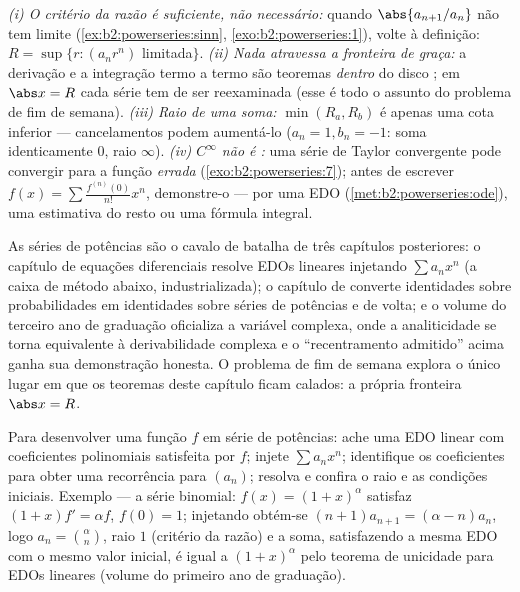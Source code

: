 \begin{remark}
\emph{(i) O critério da razão é suficiente, não necessário:} quando
$\abs{a_{n+1}/a_n}$ não tem limite
(\cref{ex:b2:powerseries:sinn}, \cref{exo:b2:powerseries:1}),
volte à definição: $R = \sup\{r : (a_nr^n)$
limitada$\}$. \emph{(ii) Nada atravessa a fronteira de graça:}
a derivação e a integração termo a termo são teoremas
\emph{dentro} do disco ; em $\abs x = R$ cada série tem de
ser reexaminada (esse é todo o assunto do problema de fim
de semana). \emph{(iii) Raio de uma soma:} $\min(R_a, R_b)$ é
apenas uma cota inferior --- cancelamentos podem aumentá-lo ($a_n = 1,
b_n = -1$: soma identicamente $0$, raio $\infty$). \emph{(iv)
$C^\infty$ não é :} uma série de Taylor convergente pode
convergir para a função \emph{errada}
(\cref{exo:b2:powerseries:7}); antes de escrever $f(x) = \sum
\frac{f^{(n)}(0)}{n!}x^n$, demonstre-o --- por uma EDO
(\cref{met:b2:powerseries:ode}), uma estimativa do resto ou uma
fórmula integral.
\end{remark}

\begin{remark}
As séries de potências são o cavalo de batalha de três capítulos posteriores: o
capítulo de equações diferenciais resolve EDOs lineares injetando
$\sum a_nx^n$ (a caixa de método abaixo, industrializada); o
capítulo de  converte identidades sobre
probabilidades em identidades sobre séries de potências e de volta; e
o volume do terceiro ano de graduação oficializa a variável complexa, onde a
analiticidade se torna equivalente à derivabilidade complexa e
o ``recentramento admitido'' acima ganha sua demonstração honesta. O
problema de fim de semana explora o único lugar em que os teoremas deste capítulo
ficam calados: a própria fronteira $\abs x = R$.
\end{remark}

\begin{method}\label{met:b2:powerseries:ode}
Para desenvolver uma função $f$ em série de potências: ache uma EDO linear com
coeficientes polinomiais satisfeita por $f$; injete $\sum a_nx^n$;
identifique os coeficientes para obter uma recorrência para $(a_n)$; resolva e
confira o raio e as condições iniciais. Exemplo --- a série
binomial: $f(x) = (1+x)^\alpha$ satisfaz $(1+x)f' = \alpha f$, $f(0)
= 1$; injetando obtém-se $(n+1)a_{n+1} = (\alpha - n)a_n$, logo $a_n =
\binom{\alpha}{n}$, raio $1$ (critério da razão) e a soma, satisfazendo
a mesma EDO com o mesmo valor inicial, é igual a $(1 + x)^\alpha$
pelo teorema de unicidade para EDOs lineares (volume do primeiro ano de graduação).
\end{method}

